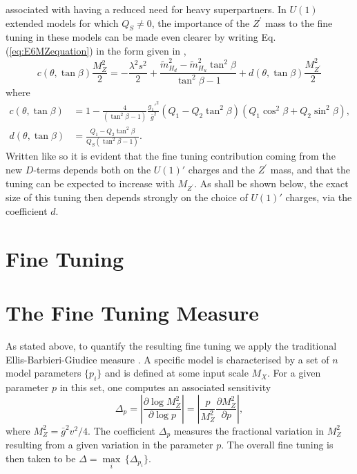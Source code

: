 \documentclass[preprint,amsmath,amssymb,aps,superscriptaddress,prd,showpacs,floatfix,nofootinbib]{revtex4-1}
\begin{document}
associated with having a reduced need for heavy superpartners. In
$U(1)$ extended models for which $Q_S\neq 0$, the importance
of the $Z^\prime$ mass to the fine tuning in these models can be made
even clearer by writing Eq. (\ref{eq:E6MZequation}) in the form given
in \cite{Athron:2013ipa},
\begin{equation}\label{eq:originalE6MZequation}
c(\theta,\tan\beta)\frac{M_Z^2}{2}=-\frac{\lambda^2 s^2}{2}+\frac{\tilde{m}_{H_d}^2-\tilde{m}_{H_u}^2\tan^2\beta}{\tan^2\beta-1}+d(\theta,\tan\beta)\frac{M_{Z^\prime}^2}{2}
\end{equation}
where 
\begin{align}
c(\theta,\tan\beta)&=1-\frac{4}{\left ( \tan^2\beta-1\right )}\frac{g_1'^2}{\bar{g}^2}\left ( Q_1-Q_2\tan^2\beta \right )\left ( Q_1\cos^2\beta+Q_2\sin^2\beta \right ),\label{eq:cdefn}\\
d(\theta,\tan\beta)&= \frac{Q_1-Q_2\tan^2\beta}{Q_S\left ( \tan^2\beta - 1\right )}.\label{eq:ddefn}
\end{align}
Written like so it is evident that the fine tuning contribution coming
from the new $D$-terms depends both on the $U(1)'$ charges and the
$Z^\prime$ mass, and that the tuning can be expected to increase with
$M_{Z^\prime}$. As shall be shown below, the exact size of this tuning
then depends strongly on the choice of $U(1)'$ charges, via the
coefficient $d$.
\section{\label{sec:tuning}Fine Tuning}
\section{\label{sec:tuningmeasure}The Fine Tuning Measure}
As stated above, to quantify the resulting fine tuning we
apply the traditional Ellis-Barbieri-Giudice measure
\cite{Ellis:1986yg,Barbieri:1987fn}. A specific model is characterised
by a set of $n$ model parameters $\{p_i\}$ and is defined at some
input scale $M_X$. For a given parameter $p$ in this set, one computes
an associated sensitivity
\begin{equation}\label{eq:bgmeasure}
\Delta_p=\left | \frac{\partial \log M_Z^2}{\partial \log p}\right
|=\left | \frac{p}{M_Z^2}\frac{\partial M_Z^2}{\partial p}\right |,
\end{equation}
where $M_Z^2=\bar{g}^2v^2/4$. The coefficient $\Delta_p$ measures the
fractional variation in $M_Z^2$ resulting from a given variation in
the parameter $p$. The overall fine tuning is then taken to be $\Delta
= \underset{i}{\max}\,\{\Delta_{p_i}\}$.\\
\end{document}
